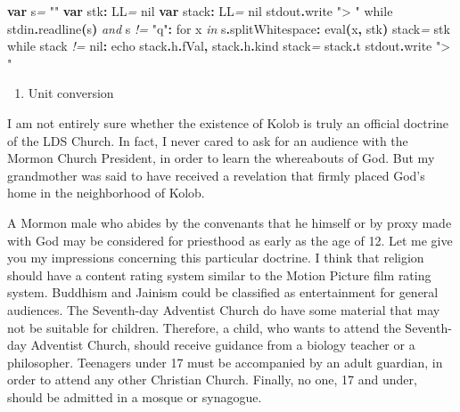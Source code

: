 \documentclass[
  12pt,
]{book}
\newenvironment{Shaded}{}{}
\newcommand{\CommentTok}[1]{\textcolor[rgb]{0.38,0.63,0.69}{\textit{#1}}}
\newcommand{\DataTypeTok}[1]{\textcolor[rgb]{0.56,0.13,0.00}{#1}}
\newcommand{\FloatTok}[1]{\textcolor[rgb]{0.25,0.63,0.44}{#1}}
\newcommand{\KeywordTok}[1]{\textcolor[rgb]{0.00,0.44,0.13}{\textbf{#1}}}
\newcommand{\NormalTok}[1]{#1}
\newcommand{\StringTok}[1]{\textcolor[rgb]{0.25,0.44,0.63}{#1}}
\providecommand{\tightlist}{%
  \setlength{\itemsep}{0pt}\setlength{\parskip}{0pt}}
\begin{document}
\begin{Shaded}
\begin{Highlighting}[]
\KeywordTok{var}\NormalTok{ s}\CommentTok{=}  \StringTok{""}
\KeywordTok{var}\NormalTok{ stk}\KeywordTok{:} \DataTypeTok{LL}\CommentTok{=} \FloatTok{nil}
\KeywordTok{var}\NormalTok{ stack}\KeywordTok{:} \DataTypeTok{LL}\CommentTok{=} \FloatTok{nil}
\NormalTok{stdout}\KeywordTok{.}\DataTypeTok{write} \StringTok{"\textgreater{} "}
\DataTypeTok{while}\NormalTok{ stdin}\KeywordTok{.}\DataTypeTok{readline}\KeywordTok{(}\NormalTok{s}\KeywordTok{)} \CommentTok{and}\NormalTok{ s }\CommentTok{!=} \StringTok{"q"}\KeywordTok{:}
  \DataTypeTok{for}\NormalTok{ x }\CommentTok{in}\NormalTok{ s}\KeywordTok{.}\DataTypeTok{splitWhitespace}\KeywordTok{:} \DataTypeTok{eval}\KeywordTok{(}\NormalTok{x}\KeywordTok{,}\NormalTok{ stk}\KeywordTok{)}
\NormalTok{  stack}\CommentTok{=}\NormalTok{ stk}
  \DataTypeTok{while}\NormalTok{ stack }\CommentTok{!=} \FloatTok{nil}\KeywordTok{:}
    \DataTypeTok{echo}\NormalTok{ stack}\KeywordTok{.}\DataTypeTok{h}\KeywordTok{.}\DataTypeTok{fVal}\KeywordTok{,}\NormalTok{ stack}\KeywordTok{.}\DataTypeTok{h}\KeywordTok{.}\DataTypeTok{kind}
\NormalTok{    stack}\CommentTok{=}\NormalTok{ stack}\KeywordTok{.}\DataTypeTok{t}
\NormalTok{  stdout}\KeywordTok{.}\DataTypeTok{write} \StringTok{"\textgreater{} "}
\end{Highlighting}
\end{Shaded}

\begin{enumerate}
\def\labelenumi{(\arabic{enumi})}
\setcounter{enumi}{23}
\tightlist
\item
  Unit conversion
\end{enumerate}

I am not entirely sure whether the existence of Kolob is truly an
official doctrine of the LDS Church. In fact, I never cared to ask for
an audience with the Mormon Church President, in order to learn the
whereabouts of God. But my grandmother was said to have received a
revelation that firmly placed God's home in the neighborhood of Kolob.

A Mormon male who abides by the convenants that he himself or by proxy
made with God may be considered for priesthood as early as the age of
12. Let me give you my impressions concerning this particular doctrine.
I think that religion should have a content rating system similar to the
Motion Picture film rating system. Buddhism and Jainism could be
classified as entertainment for general audiences. The Seventh-day
Adventist Church do have some material that may not be suitable for
children. Therefore, a child, who wants to attend the Seventh-day
Adventist Church, should receive guidance from a biology teacher or a
philosopher. Teenagers under 17 must be accompanied by an adult
guardian, in order to attend any other Christian Church. Finally, no
one, 17 and under, should be admitted in a mosque or synagogue.
\end{document}
